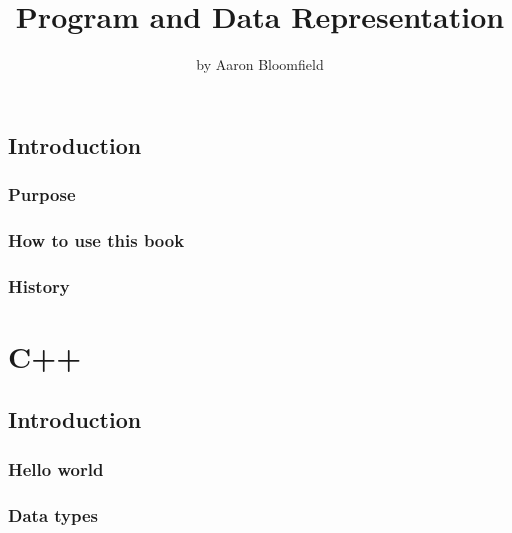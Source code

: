 \documentclass[11pt,twoside]{book}
\begin{document}
\title {Program and Data Representation}
\author {by Aaron Bloomfield}
\maketitle

\cleardoublepage
{}
\tableofcontents

\cleardoublepage
{}
\listoffigures

\cleardoublepage
{}
\listoftables

\cleardoublepage
{}
\lstlistoflistings

\cleardoublepage
{}

\chapter{Introduction}

\section{Purpose}

\section{How to use this book}

\section{History}



\part{C++}

\chapter{Introduction}

\section{Hello world}

\section{Data types}
\end{document}
